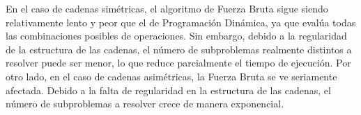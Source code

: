 En el caso de cadenas simétricas, el algoritmo de Fuerza Bruta sigue siendo relativamente lento y peor que el de Programación Dinámica, ya que evalúa todas las combinaciones posibles de operaciones. Sin embargo, debido a la regularidad de la estructura de las cadenas, el número de subproblemas realmente distintos a resolver puede ser menor, lo que reduce parcialmente el tiempo de ejecución. Por otro lado, en el caso de cadenas asimétricas, la Fuerza Bruta se ve seriamente afectada. Debido a la falta de regularidad en la estructura de las cadenas, el número de subproblemas a resolver crece de manera exponencial.\\
